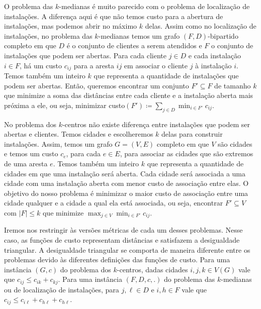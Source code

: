 \documentclass[12pt]{article}
\begin{document}
O problema das $k$-medianas é muito parecido com o problema de localização de instalações. A diferença aqui é que não temos custo para a abertura de instalações, mas podemos abrir no máximo $k$ delas. 
Assim como no localização de instalações, no problema das $k$-medianas temos um grafo $(F,D)$-bipartido completo em que $D$ é o conjunto de clientes a serem atendidos e $F$ o conjunto de instalações que podem ser abertas. Para cada cliente $j \in D$ e cada instalação $i \in F$, há um custo $c_{ij}$ para a aresta $ij$ em associar o cliente $j$ à instalação $i$. Temos também um inteiro $k$ que representa a quantidade de instalações que podem ser abertas. Então, queremos encontrar um conjunto $F' \subseteq F$ de tamanho $k$ que minimize a soma das distâncias entre cada cliente e a instalação aberta mais próxima a ele, ou seja, minimizar custo$(F') \coloneqq \sum_{j\in D} \min_{i \in F'} c_{ij}$.

No problema dos $k$-centros não existe diferença entre instalações que podem ser abertas e clientes. Temos cidades e escolheremos $k$ delas para construir instalações.
Assim, temos um grafo $G = (V,E)$ completo em que $V$ são cidades e temos um custo $c_{e}$, para cada $e \in E$, para associar as cidades que são extremos de uma aresta $e$. Temos também um inteiro $k$ que representa a quantidade de cidades em que uma instalação será aberta. Cada cidade será associada a uma cidade com uma instalação aberta com menor custo de associação entre elas. O objetivo do nosso problema é minimizar o maior custo de associação entre uma cidade qualquer e a cidade a qual ela está associada, ou seja, encontrar $F' \subseteq V$ com $|F| \leq k$ que minimize $\max_{j \in V} \min_{i \in F'} c_{ij}$.

Iremos nos restringir às versões métricas de cada um desses problemas. Nesse caso, as funções de custo representam distâncias e satisfazem a desigualdade triangular. A desigualdade triangular se comporta de maneira diferente entre os problemas devido às diferentes definições das funções de custo. Para uma instância $(G,c)$ do problema dos $k$-centros, dadas cidades $i,j,k \in V(G)$ vale que $ c_{ij} \leq c_{ik} + c_{kj}$. Para uma instância $(F,D,c,.)$ do problema das $k$-medianas ou de localização de instalações, para $j,\ell \in D$ e $i,h \in F$ vale que $c_{ij} \leq c_{i\ell} + c_{h\ell} + c_{h\ell}$.
\end{document}
